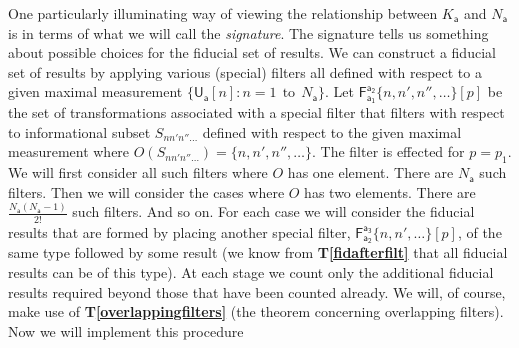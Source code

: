 \documentclass[10pt]{article}
\begin{document}
One particularly illuminating way of viewing the relationship between $K_\mathsf{a}$ and $N_\mathsf{a}$ is in terms of what we will call the \emph{signature}.  The signature tells us something about possible choices for the fiducial set of results.  We can construct a fiducial set of results by applying various (special) filters all defined with respect to a given maximal measurement $\{\mathsf{U}_\mathsf{a}[n]: n=1~~\text{to} ~~ N_\mathsf{a} \}$.   Let $\mathsf{F_{a_1}^{a_2}}\{n, n', n'',\dots \}[p]$ be the set of transformations associated with a special filter that filters with respect to informational subset $S_{nn'n''\dots}$ defined with respect to the given maximal measurement where $O(S_{nn'n''\dots })=\{ n, n', n'', \dots\}$.  The filter is effected for $p=p_1$.  We will first consider all such filters where $O$ has one element.  There are $N_\mathsf{a}$ such filters.  Then we will consider the cases where $O$ has two elements.  There are $\frac{N_\mathsf{a}(N_\mathsf{a}-1)}{2!}$ such filters.   And so on.  For each case we will consider the fiducial results that are formed by placing another special filter, $\mathsf{F_{a_2}^{a_3}}\{n, n', \dots \}[p]$, of the same type followed by some result (we know from {\bf T\ref{fidafterfilt}} that all fiducial results can be of this type).  At each stage we count only the additional fiducial results required beyond those that have been counted already.   We will, of course, make use of {\bf T\ref{overlappingfilters}} (the theorem concerning overlapping filters).  Now we will implement this procedure
\end{document}

